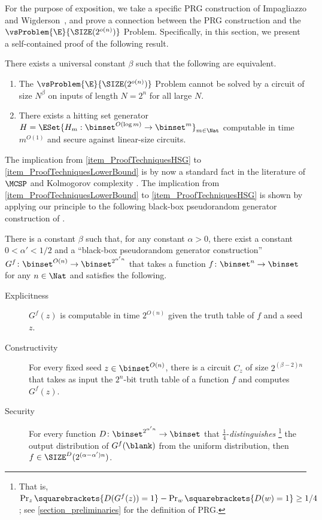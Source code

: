 \documentclass{toc}
\begin{document}
For the purpose of exposition, we take a specific PRG construction of Impagliazzo and Wigderson~\cite{ImpagliazzoW97_stoc_conf},
and prove a connection between the PRG construction and the $\vsProblem{\E}{\SIZE(2^{o(n)})}$ Problem.
Specifically, in this section, we present a self-contained proof of the following result.
\begin{theorem}
  \label{thm_ProofTechniques}
  There exists a universal constant $\beta$ such that the following are equivalent.
  \begin{enumerate}
    \item The $\vsProblem{\E}{\SIZE(2^{o(n)})}$ Problem cannot be solved by a circuit of size $N^{\beta}$ on inputs of length $N = 2^n$ for all large $N$.
          \label{item_ProofTechniquesLowerBound}
    \item There exists a hitting set generator $H = \ESet{ H_m : \binset^{O(\log m)} \to \binset^m }_{m \in \Nat}$ computable in time $m^{O(1)}$ and secure against linear-size circuits.
          \label{item_ProofTechniquesHSG}
  \end{enumerate}
\end{theorem}
The implication from \cref{item_ProofTechniquesHSG} to \cref{item_ProofTechniquesLowerBound}
is by now a standard fact in the literature of $\MCSP$ and Kolmogorov complexity \cite{RazborovR97_jcss_journals,AllenderBKMR06_siamcomp_journals}.
The implication from \cref{item_ProofTechniquesLowerBound} to \cref{item_ProofTechniquesHSG}
is shown by applying our principle to the following black-box pseudorandom generator construction of \cite{ImpagliazzoW97_stoc_conf}.
\begin{lemma}
  \label{lemma_IWBBConstruction}
  There is a constant $\beta$ such that,
  for any constant $\alpha > 0$,
  there exist
  a constant $0 < \alpha' < 1/2$ and
  a ``black-box pseudorandom generator construction''
  $G^f \colon \binset^{O(n)} \to \binset^{2^{\alpha' n}}$
  that takes a function $f \colon \binset^n \to \binset$ for any $n \in \Nat$
  and satisfies the following.
  \begin{description}
    \item[Explicitness]
          $G^f(z)$ is computable in time $2^{O(n)}$
          given the truth table of $f$ and a seed $z$.
    \item[Constructivity]
          For every fixed seed $z \in \binset^{O(n)}$,
          there is a circuit $C_z$ of size $2^{(\beta - 2) n}$ that
          takes as input the $2^n$-bit truth table of a function $f$ and
          computes $G^f(z)$.
    \item[Security]
          For every function $D \colon \binset^{2^{\alpha' n}} \to \binset$ that
          $\frac{1}{4}$-\emph{distinguishes}%
          \footnote{That is, $\Pr_z \squarebrackets{ D(G^f(z)) = 1} - \Pr_w \squarebrackets{D(w) = 1} \ge 1/4$; see \cref{section_preliminaries} for the definition of PRG.}
          the output distribution
          of $G^f(\blank)$ from the uniform distribution,
          then
          $f \in \SIZE^D(2^{(\alpha - \alpha') n})$.
  \end{description}
\end{lemma}
\end{document}
